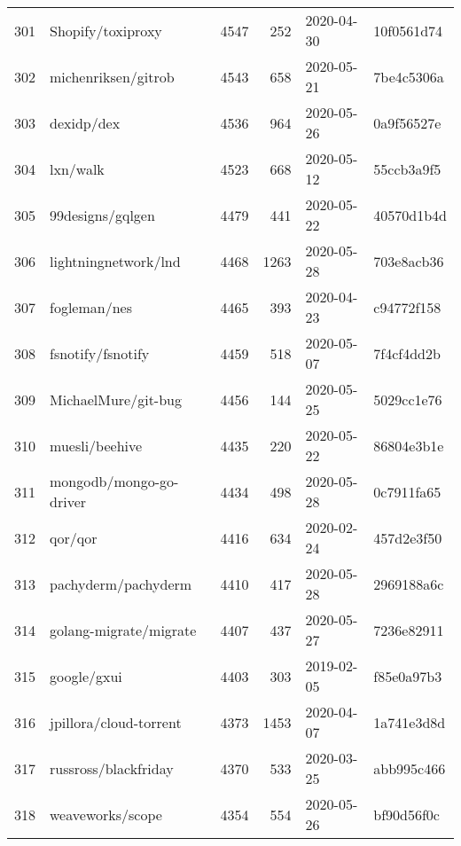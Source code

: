\begin{longtable}{llrrll}
    301 &                                  Shopify/toxiproxy &   4547 &    252 & 2020-04-30 &  10f0561d74 \\
    302 &                                michenriksen/gitrob &   4543 &    658 & 2020-05-21 &  7be4c5306a \\
    303 &                                         dexidp/dex &   4536 &    964 & 2020-05-26 &  0a9f56527e \\
    304 &                                           lxn/walk &   4523 &    668 & 2020-05-12 &  55ccb3a9f5 \\
    305 &                                   99designs/gqlgen &   4479 &    441 & 2020-05-22 &  40570d1b4d \\
    306 &                               lightningnetwork/lnd &   4468 &   1263 & 2020-05-28 &  703e8acb36 \\
    307 &                                       fogleman/nes &   4465 &    393 & 2020-04-23 &  c94772f158 \\
    308 &                                  fsnotify/fsnotify &   4459 &    518 & 2020-05-07 &  7f4cf4dd2b \\
    309 &                                MichaelMure/git-bug &   4456 &    144 & 2020-05-25 &  5029cc1e76 \\
    310 &                                     muesli/beehive &   4435 &    220 & 2020-05-22 &  86804e3b1e \\
    311 &                            mongodb/mongo-go-driver &   4434 &    498 & 2020-05-28 &  0c7911fa65 \\
    312 &                                            qor/qor &   4416 &    634 & 2020-02-24 &  457d2e3f50 \\
    313 &                                pachyderm/pachyderm &   4410 &    417 & 2020-05-28 &  2969188a6c \\
    314 &                             golang-migrate/migrate &   4407 &    437 & 2020-05-27 &  7236e82911 \\
    315 &                                        google/gxui &   4403 &    303 & 2019-02-05 &  f85e0a97b3 \\
    316 &                             jpillora/cloud-torrent &   4373 &   1453 & 2020-04-07 &  1a741e3d8d \\
    317 &                               russross/blackfriday &   4370 &    533 & 2020-03-25 &  abb995c466 \\
    318 &                                   weaveworks/scope &   4354 &    554 & 2020-05-26 &  bf90d56f0c \\

\end{longtable}
